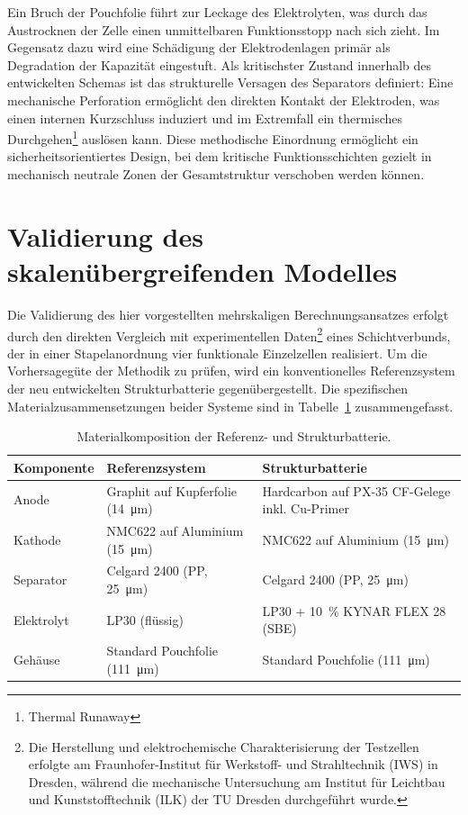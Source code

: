 

Ein Bruch der Pouchfolie führt zur Leckage des Elektrolyten, was durch das Austrocknen der Zelle einen unmittelbaren Funktionsstopp nach sich zieht. Im Gegensatz dazu wird eine Schädigung der Elektrodenlagen primär als Degradation der Kapazität eingestuft. Als kritischster Zustand innerhalb des entwickelten Schemas ist das strukturelle Versagen des Separators definiert: Eine mechanische Perforation ermöglicht den direkten Kontakt der Elektroden, was einen internen Kurzschluss induziert und im Extremfall ein thermisches Durchgehen\footnote{Thermal Runaway} auslösen kann. Diese methodische Einordnung ermöglicht ein sicherheitsorientiertes Design, bei dem kritische Funktionsschichten gezielt in mechanisch neutrale Zonen der Gesamtstruktur verschoben werden können.

\section{\label{sec:validation}Validierung des skalenübergreifenden Modelles}

Die Validierung des hier vorgestellten mehrskaligen Berechnungsansatzes erfolgt durch den direkten Vergleich mit experimentellen Daten\footnote{Die Herstellung und elektrochemische Charakterisierung der Testzellen erfolgte am Fraunhofer-Institut für Werkstoff- und Strahltechnik (IWS) in Dresden, während die mechanische Untersuchung am Institut für Leichtbau und Kunststofftechnik (ILK) der TU Dresden durchgeführt wurde.} eines Schichtverbunds, der in einer Stapelanordnung vier funktionale Einzelzellen realisiert. Um die Vorhersagegüte der Methodik zu prüfen, wird ein konventionelles Referenzsystem der neu entwickelten Strukturbatterie gegenübergestellt. Die spezifischen Materialzusammensetzungen beider Systeme sind in Tabelle~\ref{tab:material_comp} zusammengefasst.
\begin{table}[ht]
    \centering
    \caption{\label{tab:material_comp}Materialkomposition der Referenz- und Strukturbatterie.}
    \begin{tabularx}{\textwidth}{lXX}
    \toprule
    \textbf{Komponente} & \textbf{Referenzsystem} & \textbf{Strukturbatterie} \\
    \midrule
    Anode & Graphit auf Kupferfolie (\SI{14}{\micro\metre}) & Hardcarbon auf PX-35 CF-Gelege inkl. Cu-Primer \\
    \addlinespace
    Kathode & NMC622 auf Aluminium (\SI{15}{\micro\metre}) & NMC622 auf Aluminium (\SI{15}{\micro\metre}) \\
    \addlinespace
    Separator & Celgard 2400 (PP, \SI{25}{\micro\metre}) & Celgard 2400 (PP, \SI{25}{\micro\metre}) \\
    \addlinespace
    Elektrolyt & LP30 (flüssig) & LP30 + \SI{10}{\%} KYNAR FLEX 28 (SBE) \\
    \addlinespace
    Gehäuse & Standard Pouchfolie (\SI{111}{\micro\metre}) & Standard Pouchfolie (\SI{111}{\micro\metre}) \\
    \bottomrule
    \end{tabularx}
\end{table}

